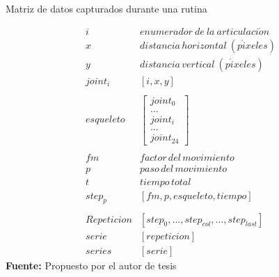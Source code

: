 \begin{formula}[H]
	\centering
	\caption{Matriz de datos capturados durante una rutina}
	\label{frm:MatrizDatosRepeticion}
	\begin{equation}
\begin{matrix}
i & enumerador\: de\: la\: articulaci\acute{o}n \\ 
x & distancia\, horizontal \: (p\acute{i}xeles) \\ 
y & distancia\, vertical\: (p\acute{i}xeles) \\ 
joint_{i}& [i,x,y] \\ 
 & \\ 
esqueleto & \begin{bmatrix}
joint_{0} \\ 
... \\ 
joint_{i}\\ 
... \\ 
joint_{24}
\end{bmatrix}  \\ 
 & \\ 
fm & factor \, del \, movimiento \\ 
p  & paso \, del \,movimiento \\ 
t  & tiempo \, total \\ 
step_{p}  & [fm,p,esqueleto, tiempo] \\
 & \\ 
Repeticion & [step_{0}, ...,  step_{col}, ..., step_{last}] \\
serie & [repeticion] \\
series & [serie]
\end{matrix}
	\end{equation}
	\textbf{Fuente:} Propuesto por el autor de tesis
\end{formula}
